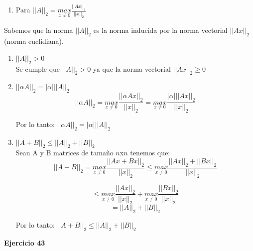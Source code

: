 \documentclass[12pt]{article}
\begin{document}
\begin{enumerate}
\begin{center}
$||A+B||_{\infty} \leq max
\{(|a_{11}|+|b_{11}| +|a_{21}|+|b_{21}|+...+|a_{1n}|+|b_{1n}|), 
(|a_{21}|+|b_{21}| +|a_{22}|+|b_{22}|+...+|a_{2n}|+|b_{2n}|),..., 
(|a_{m1}|+|b_{m1}| +|a_{m2}|+|b_{m2}|+...+|a_{mn}|+|b_{mn}|)\}$

$||A+B||_{\infty} \leq max
\{(|a_{11}|+|a_{12}|+|a_{1n}|+...+|b_{11}| +|b_{12}|+...+|b_{1n}|),
(|a_{21}|+|a_{22}|+...+|a_{2n}|+|b_{12}|+|b_{22}|+...+|b_{2n}|),...
(|a_{m1}|+|a_{m2}|+...+|a_{mn}|+|b_{m1}| +|b_{m2}|+...+|b_{mn}|)\}$
\end{center}

$$\text{Por lo tanto:} \quad ||A+B||_{\infty} \leq ||A||_{\infty}+||B||_{\infty}$$

\item Para $||A||_{2} = \underset{x \neq 0}{max} \frac{||Ax||_2}{||x||_2}$
\end{enumerate}
 
Sabemos que la norma $||A||_2$ es la norma inducida por la norma vectorial $||Ax||_2$ (norma euclidiana).\\
\begin{enumerate}
    \item  $||A||_{2}>0$\\
    Se cumple que $||A||_2 >0$ ya que la norma vectorial $||Ax||_2 \geq 0$
\item $|| \alpha A||_{2}=| \alpha|||A||_{2 }$\\
$$ 
||\alpha A||_{2} = \underset{x \neq 0}{max} \frac{||\alpha Ax||_2}{||x||_2}
= \underset{x \neq 0}{max} \frac{|\alpha|||Ax||_2}{||x||_2}
$$
\begin{center}
 Por lo tanto: $||\alpha A||_{2} = |\alpha |||A||_{2}$   
\end{center}

\item $||A+B||_{2}\leq ||A||_{2}+||B||_{2}$ \\
Sean A y B matrices de tamaño $n$x$n$ tenemos que:
$$||A+B||_{2}= \underset{x \neq 0}{max} \frac{||Ax+Bx||_2}{||x||_2} \leq 
\underset{x \neq 0}{max} \frac{||Ax||_2+||Bx||_2}{||x||_2}
$$

$$\leq 
\underset{x \neq 0}{max} \frac{||Ax||_2}{||x||_2} + \underset{x \neq 0}{max} \frac{||Bx||_2}{||x||_2}
$$
$$ = ||A||_2+||B||_2$$
\begin{center}
 Por lo tanto:  $||A+B||_{2}\leq ||A||_2+||B||_2$
\end{center}
\end{enumerate}

\noindent \textbf{Ejercicio 43}
\end{document}
